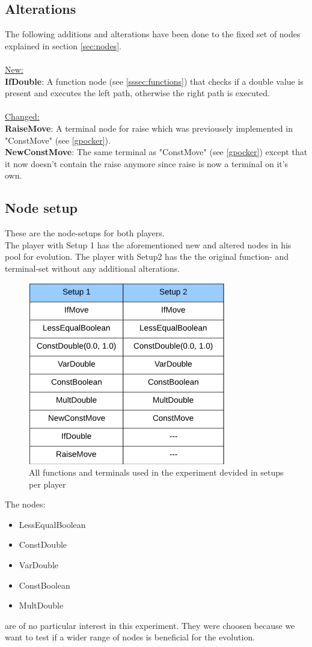 \documentclass[12pt,fleqn,a4paper]{article}
\begin{document}
\subsection{Alterations}
The following additions and alterations have been done to the fixed set of nodes explained in section \ref{sec:nodes}.\\\\
\underline{New:}\\
\textbf{IfDouble}: A function node (see \ref{sssec:functions}) that checks if a double value is present and executes the left path, otherwise the right path is executed.\\\\
\underline{Changed:}\\
\textbf{RaiseMove}: A terminal node for raise which was previousely implemented in "ConstMove" (see \ref{gpocker}).\\
\textbf{NewConstMove}: The same terminal as "ConstMove" (see \ref{gpocker}) except that it now doesn't contain the raise anymore since raise is now a terminal on it's own.

\subsection{Node setup}
\label{ssec:nodesetup}
These are the node-setups for both players.\\
The player with Setup 1 has the aforementioned new and altered nodes in his pool for evolution. The player with Setup2 has the the original function- and terminal-set without any additional alterations.\\

\begin{figure}[!ht]
	\begin{center}
	\includegraphics[width=.3\textwidth]{new_node_table.png}
	\caption{All functions and terminals used in the experiment devided in setups per player}
	\end{center}
\end{figure}	

The nodes:
\begin{itemize}
	\item LessEqualBoolean
	\item ConstDouble
	\item VarDouble
	\item ConstBoolean
	\item MultDouble 
\end{itemize}
are of no particular interest in this experiment. They were choosen because we want to test if a wider range of nodes is beneficial for the evolution.
\end{document}
